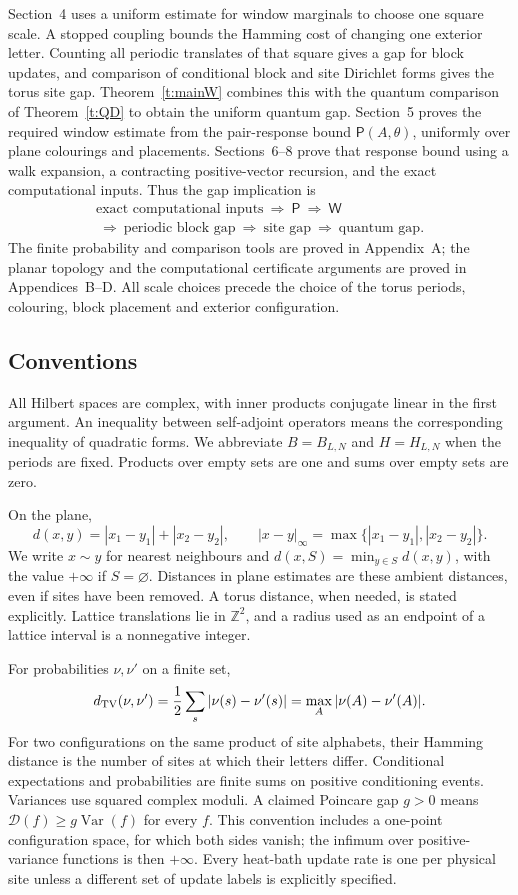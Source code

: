 Section~4 uses a uniform estimate for window marginals to choose one
square scale. A stopped coupling bounds the Hamming cost of changing
one exterior letter. Counting all periodic translates of that square
gives a gap for block updates, and comparison of conditional block
and site Dirichlet forms gives the torus site gap.
Theorem~\ref{t:mainW} combines this with the quantum comparison of
Theorem~\ref{t:QD} to obtain the uniform quantum gap.
Section~5 proves the required window estimate from the pair-response
bound \(\mathsf P(A,\theta)\), uniformly over plane colourings and
placements. Sections~6--8 prove that response bound using a walk
expansion, a contracting positive-vector recursion, and the exact
computational inputs. Thus the gap implication is
\[
 \begin{gathered}
 \text{exact computational inputs}
 \ \Longrightarrow\ \mathsf P
 \ \Longrightarrow\ \mathsf W\\
 \ \Longrightarrow\ \text{periodic block gap}
 \ \Longrightarrow\ \text{site gap}
 \ \Longrightarrow\ \text{quantum gap}.
 \end{gathered}
\]
The finite probability and comparison tools are proved in Appendix~A;
the planar topology and the computational certificate arguments are
proved in Appendices~B--D. All scale choices precede the choice of the
torus periods, colouring, block placement and exterior configuration.

\subsection{Conventions}

All Hilbert spaces are complex, with inner products conjugate linear
in the first argument. An inequality between self-adjoint operators
means the corresponding inequality of quadratic forms.
We abbreviate \(B=B_{L,N}\) and \(H=H_{L,N}\) when the periods are
fixed. Products over empty sets are one and sums over empty sets
are zero.

On the plane,
\[
 d(x,y)=|x_1-y_1|+|x_2-y_2|,\qquad
 |x-y|_\infty=\max\{|x_1-y_1|,|x_2-y_2|\}.
\]
We write \(x\sim y\) for nearest neighbours and
\(d(x,S)=\min_{y\in S}d(x,y)\), with the value \(+\infty\) if
\(S=\varnothing\). Distances in plane estimates are these ambient
distances, even if sites have been removed. A torus distance, when
needed, is stated explicitly.
Lattice translations lie in \(\mathbb Z^2\), and a radius used as
an endpoint of a lattice interval is a nonnegative integer.

For probabilities \(\nu,\nu'\) on a finite set,
\[
 d_{\rm TV}(\nu,\nu')
 =\frac12\sum_s|\nu(s)-\nu'(s)|
 =\max_A|\nu(A)-\nu'(A)|.
\]
For two configurations on the same product of site alphabets, their
Hamming distance is the number of sites at which their letters
differ. Conditional expectations and probabilities are finite sums
on positive conditioning events. Variances use squared complex
moduli. A claimed Poincare gap \(g>0\) means
\(\mathcal D(f)\ge g\operatorname{Var}(f)\) for every \(f\).
This convention includes a one-point configuration space, for which
both sides vanish; the infimum over positive-variance functions is
then \(+\infty\). Every heat-bath update rate is one per physical
site unless a different set of update labels is explicitly specified.
